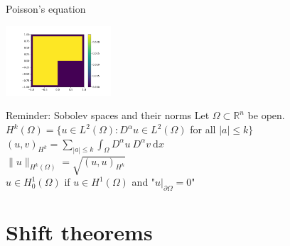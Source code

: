 \documentclass{beamer}
\begin{document}
\begin{frame}{Poisson's equation}
\begin{minipage}[b]{0.3\textwidth}
\end{minipage}
\begin{minipage}[b]{0.3\textwidth}
	\includegraphics[height=2.6cm,trim=0 0 3.4cm 0,clip=true]{sol1.png}
\end{minipage}

\end{frame}


\begin{frame}{Reminder: Sobolev spaces and their norms}
Let $\Omega \subset \mathbb{R}^n$ be open.\\[0.8cm]

$H^k(\Omega) = \{u \in L^2(\Omega): D^\alpha u \in L^2(\Omega)$ for all $|a| \leq k\}$\\[0.5cm]

$(u,v)_{H^k} = \sum_{|a| \leq k} \int_\Omega D^\alpha u \ D^\alpha v \ \text{d}x$\\[0.5cm]

$\|u\|_{H^k(\Omega)} = \sqrt{(u,u)_{H^k}}$\\[0.5cm]

$u \in H_0^1(\Omega)$ if $u \in H^1(\Omega)$ and "$u |_ { \partial \Omega} = 0$"
\end{frame}


\section{Shift theorems}
\end{document}
